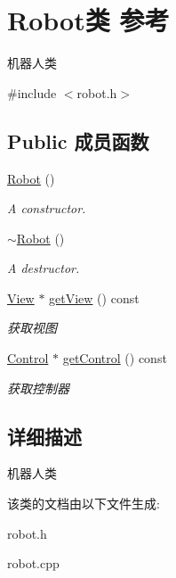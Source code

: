 \hypertarget{class_robot}{}\section{Robot类 参考}
\label{class_robot}


机器人类  




{\ttfamily \#include $<$robot.\+h$>$}

\subsection*{Public 成员函数}
\begin{DoxyCompactItemize}
\item 
\hypertarget{class_robot_a4fc7c70ae20623f05e06f2ecb388b6c4}{}\hyperlink{class_robot_a4fc7c70ae20623f05e06f2ecb388b6c4}{Robot} ()\label{class_robot_a4fc7c70ae20623f05e06f2ecb388b6c4}

\begin{DoxyCompactList}\small\item\em A constructor. \end{DoxyCompactList}\item 
\hypertarget{class_robot_a924320124b09c2f2ac1621aa210d5f38}{}\hyperlink{class_robot_a924320124b09c2f2ac1621aa210d5f38}{$\sim$\+Robot} ()\label{class_robot_a924320124b09c2f2ac1621aa210d5f38}

\begin{DoxyCompactList}\small\item\em A destructor. \end{DoxyCompactList}\item 
\hypertarget{class_robot_ab193a0de96d68613c7d39c1ef0e990b9}{}\hyperlink{class_view}{View} $\ast$ \hyperlink{class_robot_ab193a0de96d68613c7d39c1ef0e990b9}{get\+View} () const \label{class_robot_ab193a0de96d68613c7d39c1ef0e990b9}

\begin{DoxyCompactList}\small\item\em 获取视图 \end{DoxyCompactList}\item 
\hypertarget{class_robot_af3bd8421f9b7f28bfd054b47ba8475aa}{}\hyperlink{class_control}{Control} $\ast$ \hyperlink{class_robot_af3bd8421f9b7f28bfd054b47ba8475aa}{get\+Control} () const \label{class_robot_af3bd8421f9b7f28bfd054b47ba8475aa}

\begin{DoxyCompactList}\small\item\em 获取控制器 \end{DoxyCompactList}\end{DoxyCompactItemize}


\subsection{详细描述}
机器人类 

该类的文档由以下文件生成\+:\begin{DoxyCompactItemize}
\item 
robot.\+h\item 
robot.\+cpp\end{DoxyCompactItemize}
